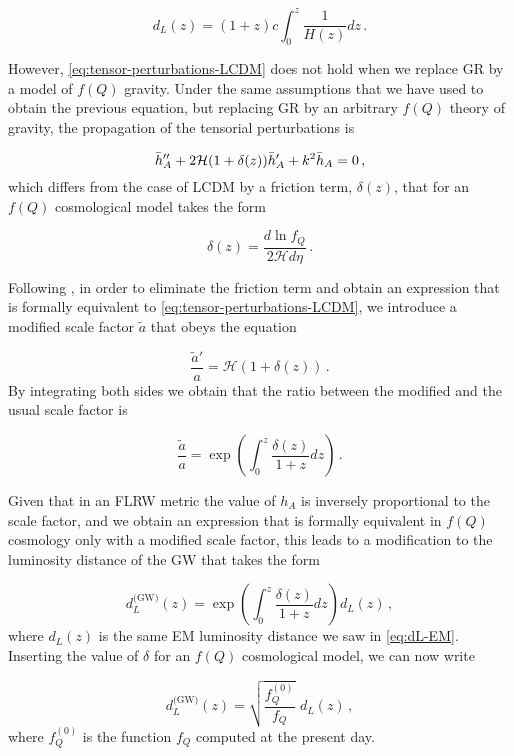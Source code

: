 \begin{equation}
    \label{eq:dL-EM}
    d_L(z) = (1+z) c \int_0^z \frac{1}{H(z)} dz \,.
\end{equation}

However, \cref{eq:tensor-perturbations-LCDM} does not hold when we replace \gls{GR} by a model of $f(Q)$ gravity. Under the same assumptions that we have used to obtain the previous equation, but replacing \gls{GR} by an arbitrary $f(Q)$ theory of gravity, the propagation of the tensorial perturbations is \cite{Jimenez2019}

\begin{equation}
    \Bar{h}_A'' + 2 \mathcal{H} (1 + \delta(z)) \Bar{h}_A' + k^2 \Bar{h}_A = 0 \,,
\end{equation}
which differs from the case of \gls{LCDM} by a friction term, $\delta(z)$, that for an $f(Q)$ cosmological model takes the form

\begin{equation}
    \delta(z) = \frac{d \ln{f_Q}}{2 \mathcal{H} d\eta} \,.
\end{equation}

Following \cite{Belgacem2017a}, in order to eliminate the friction term and obtain an expression that is formally equivalent to \cref{eq:tensor-perturbations-LCDM}, we introduce a modified scale factor $\tilde{a}$ that obeys the equation

\begin{equation}
    \frac{\tilde{a}'}{a} = \mathcal{H}(1 + \delta(z)) \,.
\end{equation}
By integrating both sides we obtain that the ratio between the modified and the usual scale factor is

\begin{equation}
    \frac{\tilde{a}}{a} = \exp \left( \int_0^z \frac{\delta (z)}{1 + z} dz \right) \,.
\end{equation}

Given that in an \gls{FLRW} metric the value of $h_A$ is inversely proportional to the scale factor, and we obtain an expression that is formally equivalent in $f(Q)$ cosmology only with a modified scale factor, this leads to a modification to the luminosity distance of the \gls{GW} that takes the form

\begin{equation}
    d_L^\text{(GW)}(z) = \exp{ \left( \int_0^z \frac{\delta(z)}{1+z} dz \right) } d_L(z) \,,
\end{equation}
where $d_L(z)$ is the same \gls{EM} luminosity distance we saw in \cref{eq:dL-EM}. Inserting the value of $\delta$ for an $f(Q)$ cosmological model, we can now write

\begin{equation}
    \label{eq:STG-generic-dLGW}
    d_L^\text{(GW)} (z) = \sqrt{\frac{f_Q^{(0)}}{f_Q}} \,\, d_L(z) \,,
\end{equation}
where $f_Q^{(0)}$ is the function $f_Q$ computed at the present day.
